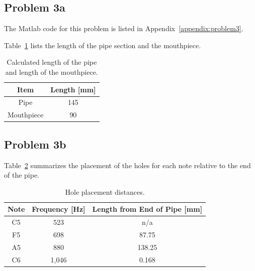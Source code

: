 \vspace{-0.25cm}
\subsection*{Problem 3a}

The Matlab code for this problem is listed in Appendix~\ref{appendix:problem3}.

Table~\ref{table:mouthpieceAndPip} lists the length of the pipe section and the mouthpiece.

\setlength{\abovecaptionskip}{0pt}
\vspace{0.1cm}
{\renewcommand{\arraystretch}{1.5}
\begin{table}[h!]
    \begin{center}
        \small
        \begin{tabular}{ | c | c | }
            \hline
            \textbf{Item}  &  \textbf{Length [mm]}  \\
            \hline
                Pipe  &  145  \\
                \hline
                \rowcolor{Gray}
                Mouthpiece  &  90  \\
            \hline
        \end{tabular}
    \end{center}
    \caption{Calculated length of the pipe and length of the mouthpiece.}
    \label{table:mouthpieceAndPip}
\end{table}


\vspace{-0.25cm}
\subsection*{Problem 3b}

Table~\ref{table:holePlacementSummary} summarizes the placement of the holes for each note relative to the end of the pipe.

\setlength{\abovecaptionskip}{0pt}
\vspace{0.1cm}
{\renewcommand{\arraystretch}{1.5}
\begin{table}[h!]
    \begin{center}
        \small
        \begin{tabular}{ | c | c | c | }
            \hline
            \textbf{Note}  &  \textbf{Frequency [Hz]}  &  \textbf{Length from End of Pipe [mm]}  \\
            \hline
                C5  &  523      &  n/a  \\
                \rowcolor{Gray}
                F5  &  698      &  87.75  \\
                A5  &  880      &  138.25  \\
                \rowcolor{Gray}
                C6  &  1,046    &  0.168  \\
            \hline
        \end{tabular}
    \end{center}
    \caption{Hole placement distances.}
    \label{table:holePlacementSummary}
\end{table}


}}
